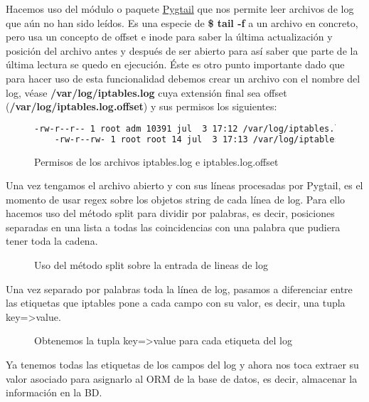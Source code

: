 Hacemos uso del módulo o paquete \href{https://pypi.python.org/pypi/pygtail}{Pygtail} que nos permite leer archivos de log que aún no han sido leídos. Es una especie de \textbf{\$ tail -f} a un archivo en concreto, pero usa un concepto de offset e inode para saber la última actualización y posición del archivo antes y después de ser abierto para así saber que parte de la última lectura se quedo en ejecución. Éste es otro punto importante dado que para hacer uso de esta funcionalidad debemos crear un archivo con el nombre del log, véase \textbf{/var/log/iptables.log} cuya extensión final sea offset (\textbf{/var/log/iptables.log.offset}) y sus permisos los siguientes:

\begin{figure}[H]
  \begin{lstlisting}[language=bash, breaklines=true]
    -rw-r--r-- 1 root adm 10391 jul  3 17:12 /var/log/iptables.log
    -rw-r--rw- 1 root root 14 jul  3 17:13 /var/log/iptables.log.offset
  \end{lstlisting}
  \caption{Permisos de los archivos iptables.log e iptables.log.offset}
\end{figure}

Una vez tengamos el archivo abierto y con sus líneas procesadas por Pygtail, es el momento de usar regex sobre los objetos string de cada línea de log. Para ello hacemos uso del método split para dividir por palabras, es decir, posiciones separadas en una lista a todas las coincidencias con una palabra que pudiera tener toda la cadena.\\

\begin{figure}[H]

\caption{Uso del método split sobre la entrada de lineas de log}
\end{figure}

Una vez separado por palabras toda la línea de log, pasamos a diferenciar entre las etiquetas que iptables pone a cada campo con su valor, es decir, una tupla key=>value. \\

\begin{figure}[H]

\caption{Obtenemos la tupla key=>value para cada etiqueta del log}
\end{figure}

Ya tenemos todas las etiquetas de los campos del log y ahora nos toca extraer su valor asociado para asignarlo al ORM de la base de datos, es decir, almacenar la información en la BD.\\

